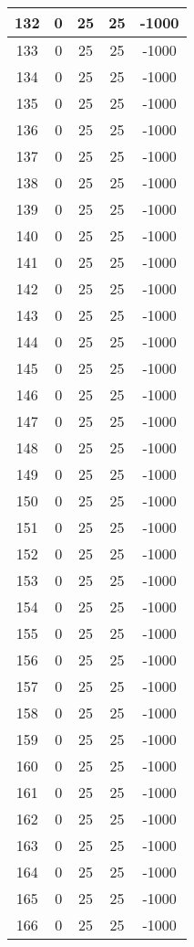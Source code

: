 \documentclass[letterpaper, 12pt]{article}
\begin{document}
\begin{longtable}{|c|c|c|c|c|}
\hline
132 & 0 & 25 & 25 & -1000 \\
\hline
133 & 0 & 25 & 25 & -1000 \\
\hline
134 & 0 & 25 & 25 & -1000 \\
\hline
135 & 0 & 25 & 25 & -1000 \\
\hline
136 & 0 & 25 & 25 & -1000 \\
\hline
137 & 0 & 25 & 25 & -1000 \\
\hline
138 & 0 & 25 & 25 & -1000 \\
\hline
139 & 0 & 25 & 25 & -1000 \\
\hline
140 & 0 & 25 & 25 & -1000 \\
\hline
141 & 0 & 25 & 25 & -1000 \\
\hline
142 & 0 & 25 & 25 & -1000 \\
\hline
143 & 0 & 25 & 25 & -1000 \\
\hline
144 & 0 & 25 & 25 & -1000 \\
\hline
145 & 0 & 25 & 25 & -1000 \\
\hline
146 & 0 & 25 & 25 & -1000 \\
\hline
147 & 0 & 25 & 25 & -1000 \\
\hline
148 & 0 & 25 & 25 & -1000 \\
\hline
149 & 0 & 25 & 25 & -1000 \\
\hline
150 & 0 & 25 & 25 & -1000 \\
\hline
151 & 0 & 25 & 25 & -1000 \\
\hline
152 & 0 & 25 & 25 & -1000 \\
\hline
153 & 0 & 25 & 25 & -1000 \\
\hline
154 & 0 & 25 & 25 & -1000 \\
\hline
155 & 0 & 25 & 25 & -1000 \\
\hline
156 & 0 & 25 & 25 & -1000 \\
\hline
157 & 0 & 25 & 25 & -1000 \\
\hline
158 & 0 & 25 & 25 & -1000 \\
\hline
159 & 0 & 25 & 25 & -1000 \\
\hline
160 & 0 & 25 & 25 & -1000 \\
\hline
161 & 0 & 25 & 25 & -1000 \\
\hline
162 & 0 & 25 & 25 & -1000 \\
\hline
163 & 0 & 25 & 25 & -1000 \\
\hline
164 & 0 & 25 & 25 & -1000 \\
\hline
165 & 0 & 25 & 25 & -1000 \\
\hline
166 & 0 & 25 & 25 & -1000 \\

\end{longtable}
\end{document}
